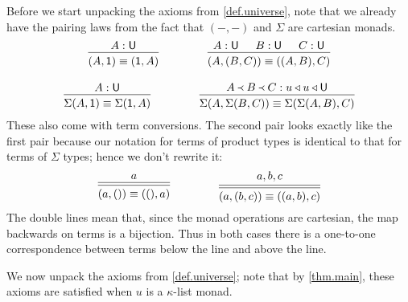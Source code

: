 \documentclass[11pt, one side, article]{memoir}
\theoremstyle{definition}
\theoremstyle{plain}
\newcommand{\tn}[1]{\textnormal{#1}}
\newcommand{\0}{\textsf{0}}
\newcommand{\1}{\tn{\textsf{1}}}
\newcommand{\U}{\tn{\textsf{U}}}
\newcommand{\tri}{\mathbin{\triangleleft}}
\newcommand{\founds}{\Yleft}
\begin{document}
Before we start unpacking the axioms from \cref{def.universe}, note that we already have the pairing laws from the fact that $(-,-)$ and $\Sigma$ are cartesian monads.
\begin{gather*}
\begin{prooftree}
	\Hypo{A:\U}
	\Infer1{(A,\1)\equiv (\1,A)}
\end{prooftree}
\hspace{.6in}
\begin{prooftree}
	\Hypo{A:\U}
	\Hypo{B:\U}
	\Hypo{C:\U}
	\Infer3{(A,(B,C))\equiv ((A,B),C)}
\end{prooftree}
\\[10pt]\nopagebreak
\begin{prooftree}
	\Hypo{A:\U}
	\Infer1{\Sigma(A,\1)\equiv \Sigma(\1,A)}
\end{prooftree}
\hspace{.6in}
\begin{prooftree}
	\Hypo{A\founds B\founds C:u\tri u\tri\U}
	\Infer1{\Sigma(A,\Sigma(B,C))\equiv \Sigma(\Sigma(A,B),C)}
\end{prooftree}
\end{gather*}
These also come with term conversions. The second pair looks exactly like the first pair because our notation for terms of product types is identical to that for terms of $\Sigma$ types; hence we don't rewrite it:
\begin{gather*}
\begin{prooftree}
	\Hypo{a}
	\Infer[double]1{(a,())\equiv ((),a)}
\end{prooftree}
\hspace{.6in}
\begin{prooftree}
	\Hypo{a,b,c}
	\Infer[double]1{(a,(b,c))\equiv ((a,b),c)}
\end{prooftree}
\end{gather*}
The double lines mean that, since the monad operations are cartesian, the map backwards on terms is a bijection. Thus in both cases there is a one-to-one correspondence between terms below the line and above the line.

We now unpack the axioms from \cref{def.universe}; note that by \cref{thm.main}, these axioms are satisfied when $u$ is a $\kappa$-list monad. 
\end{document}
